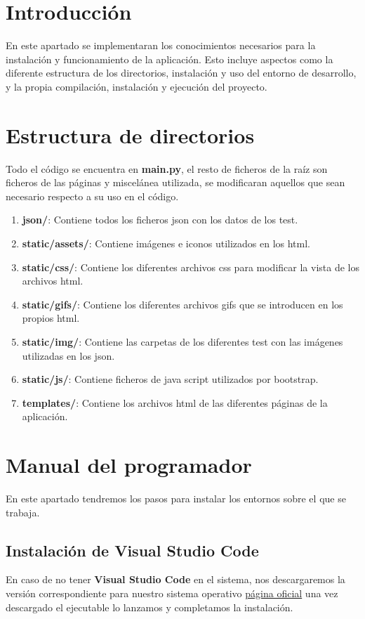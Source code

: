 
\section{Introducción}
En este apartado se implementaran  los conocimientos necesarios para la instalación y funcionamiento  de la aplicación. Esto incluye aspectos como la diferente estructura de los directorios, instalación y uso del entorno de desarrollo, y la propia compilación, instalación y ejecución del proyecto.
\section{Estructura de directorios}
Todo el código se encuentra en \textbf{main.py}, el resto de ficheros de la raíz son ficheros de las páginas y miscelánea utilizada, se modificaran aquellos que sean necesario respecto a su uso en el código.
\begin{enumerate}
    \item \textbf{json/}: Contiene todos los ficheros json con los datos de los test.    
    \item \textbf{static/assets/}: Contiene imágenes e iconos utilizados en los html.
    \item \textbf{static/css/}: Contiene los diferentes archivos css para modificar la vista de los archivos html.
    \item \textbf{static/gifs/}: Contiene los diferentes archivos gifs que se introducen en los propios html.
    \item \textbf{static/img/}: Contiene las carpetas de los diferentes test con las imágenes utilizadas en los json.
    \item \textbf{static/js/}: Contiene ficheros de java script utilizados por bootstrap.
    \item \textbf{templates/}: Contiene los archivos html de las diferentes páginas de la aplicación.
\end{enumerate} 
\section{Manual del programador}
En este apartado tendremos los pasos para instalar los entornos sobre el que se trabaja.
\subsection{Instalación de Visual Studio Code}
En caso de no tener \textbf{Visual Studio Code} en el sistema, nos descargaremos la versión correspondiente para nuestro sistema operativo \href{https://code.visualstudio.com/}{página oficial} una vez descargado el ejecutable lo lanzamos y completamos la instalación.
